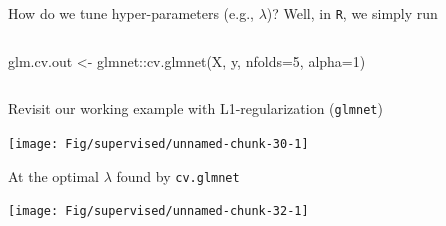 \documentclass[
  ignorenonframetext,
  aspectratio=169]{beamer}
\newenvironment{Shaded}{\begin{snugshade}}{\end{snugshade}}
\newcommand{\AttributeTok}[1]{\textcolor[rgb]{0.77,0.63,0.00}{#1}}
\newcommand{\DecValTok}[1]{\textcolor[rgb]{0.00,0.00,0.81}{#1}}
\newcommand{\FunctionTok}[1]{\textcolor[rgb]{0.00,0.00,0.00}{#1}}
\newcommand{\NormalTok}[1]{#1}
\newcommand{\OtherTok}[1]{\textcolor[rgb]{0.56,0.35,0.01}{#1}}
\newcommand{\SpecialCharTok}[1]{\textcolor[rgb]{0.00,0.00,0.00}{#1}}
\begin{document}
\begin{frame}[fragile]{How do we tune hyper-parameters (e.g.,
\(\lambda\))?}
\protect\hypertarget{how-do-we-tune-hyper-parameters-e.g.-lambda}{}
Well, in \texttt{R}, we simply run

\begin{columns}[T]
\begin{column}{.35\textwidth}
\large

\begin{Shaded}
\begin{Highlighting}[]
\NormalTok{glm.cv.out }\OtherTok{\textless{}{-}}
\NormalTok{ glmnet}\SpecialCharTok{::}\FunctionTok{cv.glmnet}\NormalTok{(X,}
\NormalTok{          y,}
          \AttributeTok{nfolds=}\DecValTok{5}\NormalTok{,}
          \AttributeTok{alpha=}\DecValTok{1}\NormalTok{)}
\end{Highlighting}
\end{Shaded}

\normalsize
\end{column}

\begin{column}{.55\textwidth}
\scriptsize


\normalsize
\end{column}
\end{columns}
\end{frame}

\begin{frame}{Revisit our working example with L1-regularization
(\texttt{glmnet})}
\protect\hypertarget{revisit-our-working-example-with-l1-regularization-glmnet}{}
\scriptsize

\begin{center}\texttt{[image: Fig/supervised/unnamed-chunk-30-1]} \end{center}

\normalsize
\end{frame}

\begin{frame}{At the optimal \(\lambda\) found by \texttt{cv.glmnet}}
\protect\hypertarget{at-the-optimal-lambda-found-by-cv.glmnet}{}
\scriptsize

\normalsize

\scriptsize

\begin{center}\texttt{[image: Fig/supervised/unnamed-chunk-32-1]} \end{center}

\normalsize
\end{frame}
\end{document}

